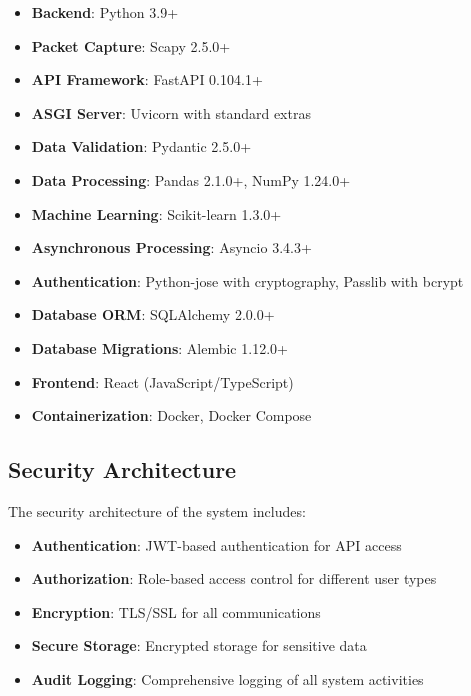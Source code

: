 \begin{itemize}
    \item \textbf{Backend}: Python 3.9+
    \item \textbf{Packet Capture}: Scapy 2.5.0+
    \item \textbf{API Framework}: FastAPI 0.104.1+
    \item \textbf{ASGI Server}: Uvicorn with standard extras
    \item \textbf{Data Validation}: Pydantic 2.5.0+
    \item \textbf{Data Processing}: Pandas 2.1.0+, NumPy 1.24.0+
    \item \textbf{Machine Learning}: Scikit-learn 1.3.0+
    \item \textbf{Asynchronous Processing}: Asyncio 3.4.3+
    \item \textbf{Authentication}: Python-jose with cryptography, Passlib with bcrypt
    \item \textbf{Database ORM}: SQLAlchemy 2.0.0+
    \item \textbf{Database Migrations}: Alembic 1.12.0+
    \item \textbf{Frontend}: React (JavaScript/TypeScript)
    \item \textbf{Containerization}: Docker, Docker Compose
\end{itemize}

\subsection{Security Architecture}
The security architecture of the system includes:

\begin{itemize}
    \item \textbf{Authentication}: JWT-based authentication for API access
    \item \textbf{Authorization}: Role-based access control for different user types
    \item \textbf{Encryption}: TLS/SSL for all communications
    \item \textbf{Secure Storage}: Encrypted storage for sensitive data
    \item \textbf{Audit Logging}: Comprehensive logging of all system activities
\end{itemize}